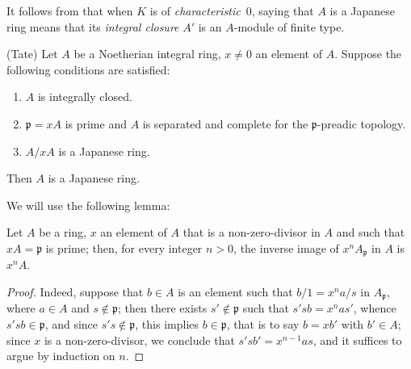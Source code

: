It follows from  that when $K$ is of \emph{characteristic}~$0$, saying that $A$ is a Japanese ring means that its \emph{integral closure} $A'$ is an $A$-module of finite type.

\begin{theorem}[23.1.3]
\label{0.23.1.3}
\textnormal{(Tate)}
Let $A$ be a Noetherian integral ring, $x\neq 0$ an element of $A$.
Suppose the following conditions are satisfied:
\begin{enumerate}
  \item[{\rm(i)}] $A$ is integrally closed.
  \item[{\rm(ii)}] $\mathfrak{p}=xA$ is prime and $A$ is separated and complete for the $\mathfrak{p}$-preadic topology.
  \item[{\rm(iii)}] $A/xA$ is a Japanese ring.
\end{enumerate}
Then $A$ is a Japanese ring.
\end{theorem}

We will use the following lemma:

\begin{lemma}[23.1.3.1]
\label{0.23.1.3.1}
Let $A$ be a ring, $x$ an element of $A$ that is a non-zero-divisor in $A$ and such that $xA=\mathfrak{p}$ is prime; then, for every integer $n>0$, the inverse image of $x^nA_\mathfrak{p}$ in $A$ is $x^nA$.
\end{lemma}

\begin{proof}
Indeed, suppose that $b\in A$ is an element such that $b/1=x^na/s$ in $A_\mathfrak{p}$, where $a\in A$ and $s\notin\mathfrak{p}$; then there exists $s'\notin\mathfrak{p}$ such that $s'sb=x^nas'$, whence $s'sb\in\mathfrak{p}$, and since $s's\notin\mathfrak{p}$, this implies $b\in\mathfrak{p}$, that is to say $b=xb'$ with $b'\in A$; since $x$ is a non-zero-divisor, we conclude that $s'sb'=x^{n-1}as$, and it suffices to argue by induction on $n$.
\end{proof}

